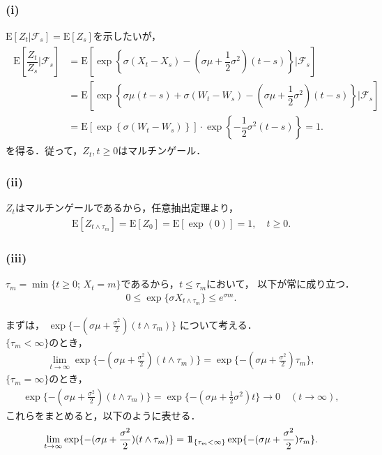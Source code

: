 \documentclass[a4paper,11pt]{jsarticle}
\newcommand{\df}[2]{\dfrac{#1}{#2}}
\newcommand{\E}{\mathrm{E}}
\newcommand{\F}{\mathcal{F}}
\newcommand{\1}{\mbox{1}\hspace{-0.30em}\mbox{1}}
\begin{document}
\subsection{}
\subsubsection{(i)}
$\E[Z_t|\F_s]=\E[Z_s]$を示したいが，
\begin{align*}
  \begin{split}
     \E\left[\df{Z_t}{Z_s}|\F_s\right]
     &=\E\left[\exp\left\{ \sigma(X_t-X_s)
     -(\sigma\mu+\df{1}{2}\sigma^2)(t-s) \right\}|\F_s\right]\\
     &=\E\left[\exp\left\{\sigma\mu(t-s)+\sigma(W_t-W_s)
     -(\sigma\mu+\df{1}{2}\sigma^2)(t-s)\right\}|\F_s\right]\\
     &=\E\left[\exp\left\{\sigma(W_t-W_s)\right\}\right]
     \cdot\exp\left\{-\df{1}{2}\sigma^2(t-s)\right\}=1.
   \end{split}
\end{align*}
を得る．従って，$Z_t,t\geq0$はマルチンゲール．

\subsubsection{(ii)}
$Z_t$はマルチンゲールであるから，任意抽出定理より，
\begin{align*}
  \E[Z_{t\wedge\tau_m}]=\E[Z_0]=\E[\exp(0)]=1, \quad
  t\geq0.
\end{align*}

\subsubsection{(iii)}
$\tau_m=\min\{t\geq0; \, X_t=m\}$であるから，$t\leq\tau_m$において，
以下が常に成り立つ．
\begin{align*}
  0 \leq \exp\{\sigma X_{t\wedge\tau_m}\} \leq e^{\sigma m}.
\end{align*}

まずは，
$\exp\{-(\sigma\mu+\frac{\sigma^2}{2})(t\wedge\tau_m)\}$
について考える．\\
$\{\tau_m<\infty\}$のとき，
\begin{align*}
  \lim_{t\to\infty}
  \exp\{-(\sigma\mu+\frac{\sigma^2}{2})(t\wedge\tau_m)\}
  = \exp\{-(\sigma\mu+\frac{\sigma^2}{2})\tau_m\},
\end{align*}
$\{\tau_m=\infty\}$のとき，
\begin{align*}
  \exp\{-(\sigma\mu+\frac{\sigma^2}{2})(t\wedge\tau_m)\}
  = \exp\{-(\sigma\mu+\frac{1}{2}\sigma^2)t\}
  \to0 \quad (t\to\infty),
\end{align*}
これらをまとめると，以下のように表せる．
\begin{align*}
  \lim_{t\to\infty}
  \exp\{-(\sigma\mu+\frac{\sigma^2}{2})(t\wedge\tau_m)\}
  = \1_{\{\tau_m<\infty\}}
  \exp\{-(\sigma\mu+\frac{\sigma^2}{2})\tau_m\}.
\end{align*}
\end{document}
